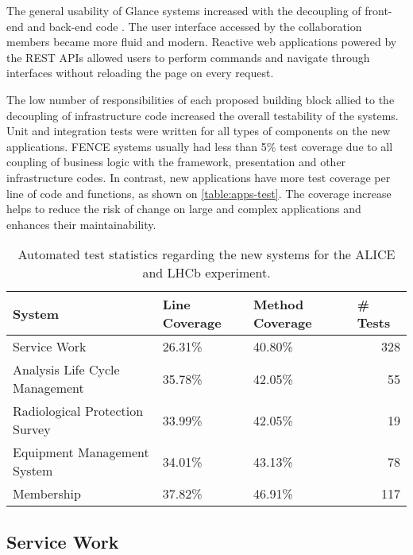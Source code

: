 The general usability of Glance systems increased with the decoupling of front-end and back-end code \cite{de-jesus-tcc}. The user interface accessed by the collaboration members became more fluid and modern. Reactive web applications powered by the REST APIs allowed users to perform commands and navigate through interfaces without reloading the page on every request.

The low number of responsibilities of each proposed building block allied to the decoupling of infrastructure code increased the overall testability of the systems. Unit and integration tests were written for all types of components on the new applications. FENCE systems usually had less than 5\% test coverage due to all coupling of business logic with the framework, presentation and other infrastructure codes. In contrast, new applications have more test coverage per line of code and functions, as shown on \autoref{table:apps-test}. The coverage increase helps to reduce the risk of change on large and complex applications and enhances their maintainability.

\begin{table}[htbp]
\begin{tabular}{|l|l|l|r|}
\hline
System                         & Line Coverage & Method Coverage & \multicolumn{1}{l|}{\# Tests} \\ \hline
Service Work                   & 26.31\%       & 40.80\%         & 328                           \\
Analysis Life Cycle Management & 35.78\%       & 42.05\%         & 55                            \\
Radiological Protection Survey & 33.99\%       & 42.05\%         & 19                            \\
Equipment Management System    & 34.01\%       & 43.13\%         & 78                            \\
Membership                     & 37.82\%       & 46.91\%         & 117                           \\ \hline
\end{tabular}
\caption{Automated test statistics regarding the new systems for the ALICE and LHCb experiment.}
\label{table:apps-test}
\end{table}

\subsection{Service Work}

